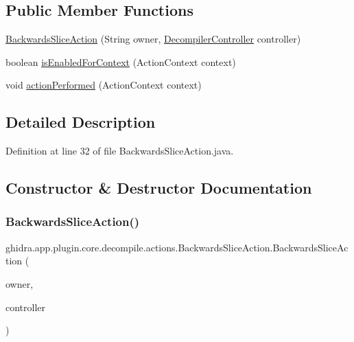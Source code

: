 \subsection*{Public Member Functions}
\begin{DoxyCompactItemize}
\item 
\mbox{\hyperlink{classghidra_1_1app_1_1plugin_1_1core_1_1decompile_1_1actions_1_1_backwards_slice_action_adbc4299ede28419c20e18634042d428a}{Backwards\+Slice\+Action}} (String owner, \mbox{\hyperlink{classghidra_1_1app_1_1decompiler_1_1component_1_1_decompiler_controller}{Decompiler\+Controller}} controller)
\item 
boolean \mbox{\hyperlink{classghidra_1_1app_1_1plugin_1_1core_1_1decompile_1_1actions_1_1_backwards_slice_action_a2115a1a2187a64114301e01bca70c2f3}{is\+Enabled\+For\+Context}} (Action\+Context context)
\item 
void \mbox{\hyperlink{classghidra_1_1app_1_1plugin_1_1core_1_1decompile_1_1actions_1_1_backwards_slice_action_a65ba0eb39c38d048fbcbefd0113d1530}{action\+Performed}} (Action\+Context context)
\end{DoxyCompactItemize}


\subsection{Detailed Description}


Definition at line 32 of file Backwards\+Slice\+Action.\+java.



\subsection{Constructor \& Destructor Documentation}
\mbox{\label{classghidra_1_1app_1_1plugin_1_1core_1_1decompile_1_1actions_1_1_backwards_slice_action_adbc4299ede28419c20e18634042d428a}} 
\subsubsection{\texorpdfstring{BackwardsSliceAction()}{BackwardsSliceAction()}}
{\footnotesize\ttfamily ghidra.\+app.\+plugin.\+core.\+decompile.\+actions.\+Backwards\+Slice\+Action.\+Backwards\+Slice\+Action (\begin{DoxyParamCaption}\item[{String}]{owner,  }\item[{\mbox{\hyperlink{classghidra_1_1app_1_1decompiler_1_1component_1_1_decompiler_controller}{Decompiler\+Controller}}}]{controller }\end{DoxyParamCaption})\hspace{0.3cm}{\ttfamily [inline]}}



